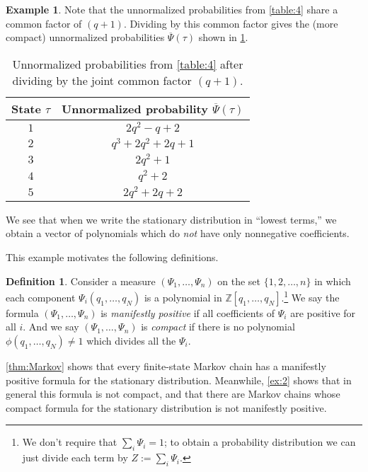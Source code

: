 \documentclass[11pt]{amsart}
\newcommand{\Z}{\mathbb{Z}}
\theoremstyle{definition}
\newtheorem{definition}[theorem]{Definition}
\newtheorem{example}[theorem]{Example}
\theoremstyle{remark}
\begin{document}
\begin{example}
Note that the unnormalized probabilities from \cref{table:4} share a common factor of $(q+1)$.
Dividing by this common factor gives the  (more compact)
unnormalized probabilities $\overline{\Psi}(\tau)$ shown in 
\cref{table:5}.
\begin{table}[h]
\begin{center}
\begin{tabular}{|c c| }
    \hline
	State $\tau$ & Unnormalized probability $\overline{\Psi}(\tau)$\\
    \hline 
	$1$ & $2q^2-q+2$\\
	$2$ & $q^3+2q^2+2q+1$\\
	$3$  & $2q^2+1$\\
	$4$  & $q^2+2$\\
	$5$ & $2q^2+2q+2$\\
    \hline
    \end{tabular}
\end{center}
	\caption{Unnormalized probabilities from 
	\cref{table:4}
	 after dividing by the joint 
	common factor $(q+1)$.}
	\label{table:5}
\end{table}

We see that when we write the stationary distribution in 
	``lowest terms,'' we obtain a vector of polynomials which do \emph{not} have 
	only nonnegative coefficients.
\end{example}

This example motivates the following definitions.

\begin{definition}
Consider a measure 
$(\Psi_1,\dots,\Psi_n)$ 
on the %
set $\{1,2,\dots,n\}$ in which each component 
	$\Psi_i(q_1,\dots,q_N)$ is a 
	polynomial in $\Z[q_1,\dots,q_N]$.\footnote{We don't require 
	that $\sum_i \Psi_i = 1$; to obtain a probability distribution
	we can just divide each term by $Z:=\sum_i \Psi_i$.}
We say  the formula 
$(\Psi_1,\dots,\Psi_n)$ 
is \emph{manifestly positive} if 
all coefficients
of 
	$\Psi_i$ are positive for all $i$.
And we say
$(\Psi_1,\dots,\Psi_n)$ 
  is \emph{compact} 
	if there is no polynomial $\phi(q_1,\dots,q_N)\neq 1$ which divides  all the 
	$\Psi_i$.
\end{definition}

\cref{thm:Markov} shows that every finite-state Markov chain has 
a manifestly positive formula for the stationary distribution.
Meanwhile, \cref{ex:2} shows that in general this formula 
is not compact, and 
that 
there are Markov chains whose
 compact formula for the stationary distribution  is 
not manifestly positive.
\end{document}

